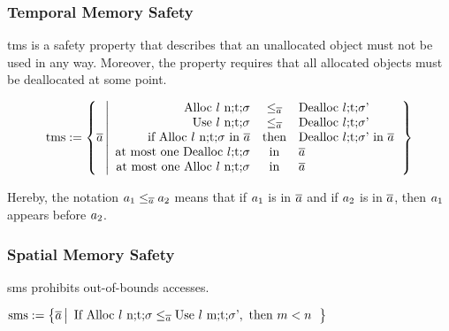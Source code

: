 \documentclass[dvipsnames]{llncs}
\begin{document}
\subsubsection{Temporal Memory Safety}

\gls*{tms} is a safety property that describes that an unallocated object must not be used in any way.
Moreover, the property requires that all allocated objects must be deallocated at some point.

\begin{definition}\label{def:trace:tmsdef}
  $$
  \tmssafe:=\left\{\trace \left| \begin{array}{rcl}
                              \ev{Alloc\ \loc\ n;\sandboxtag;\securitytag}&\le_{\trace}&\ev{Dealloc\ \loc;\sandboxtag;\securitytag'} \\
                              \ev{Use\ \loc\ n;\sandboxtag;\securitytag}&\le_{\trace}&\ev{Dealloc\ \loc;\sandboxtag;\securitytag'} \\
                              \text{if }\ev{Alloc\ \loc\ n;\sandboxtag;\securitytag}\text{ in }\trace&\text{then}&\ev{Dealloc\ \loc;\sandboxtag;\securitytag'}\text{ in }\trace \\
                              \text{at most one }\ev{Dealloc\ \loc;\sandboxtag;\securitytag}&\text{in}&\trace \\
                              \text{at most one }\ev{Alloc\ \loc\ n;\sandboxtag;\securitytag}&\text{in}&\trace \\
                            \end{array}\right.\right\}
  $$
\end{definition}
Hereby, the notation $\event[_{1}]\le_{\trace}\event[_{2}]$ means that if $\event[_{1}]$ is in $\trace$ and if $\event[_{2}]$ is in $\trace$, then $\event[_{1}]$ appears before $\event[_{2}]$.

\subsubsection{Spatial Memory Safety}

\gls*{sms} prohibits out-of-bounds accesses.

\begin{definition}\label{def:trace:smsdef}

  \noindent
  $
  \smssafe:=\left\{\trace \left|\begin{array}{rcl}
                                  \text{If }\ev{Alloc\ \loc\ n;\sandboxtag;\securitytag}\le_{\trace}\ev{Use\ \loc\ m;\sandboxtag;\securitytag'}, \text{ then }m<n
                                \end{array}\right.\right\}
                                $
\end{definition}
\end{document}
